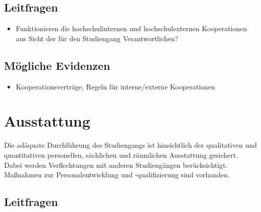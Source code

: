 \section{Leitfragen}\label{leitfragen}

\begin{itemize}
\tightlist
\item
  Funktionieren die hochschulinternen und hochschulexternen
  Kooperationen aus Sicht der für den Studiengang Verantwortlichen?
\end{itemize}

\section{Mögliche Evidenzen}\label{muxf6gliche-evidenzen}

\begin{itemize}
\tightlist
\item
  Kooperationsverträge, Regeln für interne/externe Kooperationen
\end{itemize}

%



\chapter{Ausstattung}\label{Ausstattung}


Die adäquate Durchführung des Studiengangs ist hinsichtlich der
qualitativen und quantitativen personellen, sächlichen und räumlichen
Ausstattung gesichert. Dabei werden Verflechtungen mit anderen
Studiengängen berücksichtigt. Maßnahmen zur Personalentwicklung und
-qualifizierung sind vorhanden.

\section{Leitfragen}\label{leitfragen}

